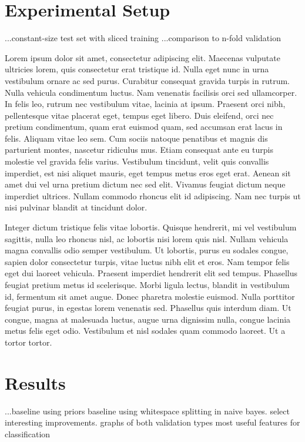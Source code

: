 \documentclass[letterpaper]{article}
\begin{document}
\section{Experimental Setup}
...constant-size test set with sliced training
...comparison to n-fold validation

Lorem ipsum dolor sit amet, consectetur adipiscing elit. Maecenas vulputate ultricies lorem, quis consectetur erat tristique id. Nulla eget nunc in urna vestibulum ornare ac sed purus. Curabitur consequat gravida turpis in rutrum. Nulla vehicula condimentum luctus. Nam venenatis facilisis orci sed ullamcorper. In felis leo, rutrum nec vestibulum vitae, lacinia at ipsum. Praesent orci nibh, pellentesque vitae placerat eget, tempus eget libero. Duis eleifend, orci nec pretium condimentum, quam erat euismod quam, sed accumsan erat lacus in felis. Aliquam vitae leo sem. Cum sociis natoque penatibus et magnis dis parturient montes, nascetur ridiculus mus. Etiam consequat ante eu turpis molestie vel gravida felis varius. Vestibulum tincidunt, velit quis convallis imperdiet, est nisi aliquet mauris, eget tempus metus eros eget erat. Aenean sit amet dui vel urna pretium dictum nec sed elit. Vivamus feugiat dictum neque imperdiet ultrices. Nullam commodo rhoncus elit id adipiscing. Nam nec turpis ut nisi pulvinar blandit at tincidunt dolor.

Integer dictum tristique felis vitae lobortis. Quisque hendrerit, mi vel vestibulum sagittis, nulla leo rhoncus nisl, ac lobortis nisi lorem quis nisl. Nullam vehicula magna convallis odio semper vestibulum. Ut lobortis, purus eu sodales congue, sapien dolor consectetur turpis, vitae luctus nibh elit et eros. Nam tempor felis eget dui laoreet vehicula. Praesent imperdiet hendrerit elit sed tempus. Phasellus feugiat pretium metus id scelerisque. Morbi ligula lectus, blandit in vestibulum id, fermentum sit amet augue. Donec pharetra molestie euismod. Nulla porttitor feugiat purus, in egestas lorem venenatis sed. Phasellus quis interdum diam. Ut congue, magna at malesuada luctus, augue urna dignissim nulla, congue lacinia metus felis eget odio. Vestibulum et nisl sodales quam commodo laoreet. Ut a tortor tortor.

\section{Results}

...baseline using priors
  baseline using whitespace splitting in naive bayes.
  select interesting improvements.
  graphs of both validation types
  most useful features for classification
\end{document}
